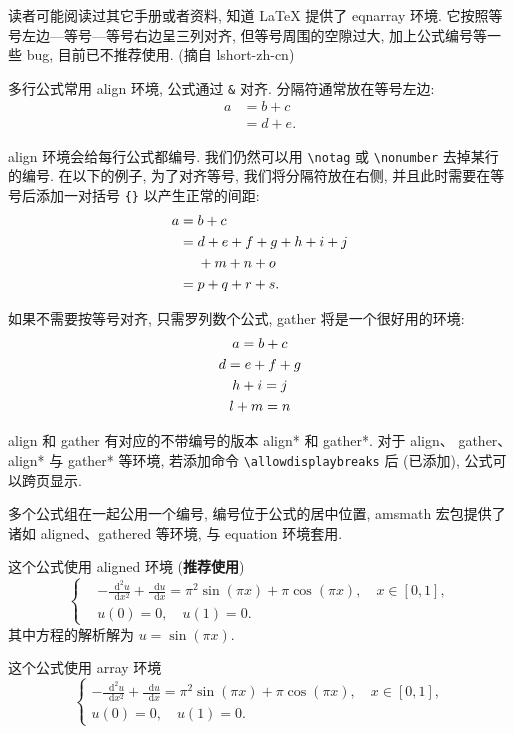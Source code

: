 \documentclass[zihao=-4,twoside,final]{ctexart}
\numberwithin{equation}{section}
\numberwithin{figure}{section}
\numberwithin{table}{section}
\theoremstyle{plain}
\newcommand{\dif}{\mathop{}\!\mathrm{d}}
\begin{document}
读者可能阅读过其它手册或者资料, 知道 LaTeX 提供了 eqnarray 环境. 它按照等号左边—等号—等号右边呈三列对齐, 但等号周围的空隙过大, 加上公式编号等一些 bug, 目前已不推荐使用. (摘自 lshort-zh-cn)

多行公式常用 align 环境, 公式通过 \verb|&| 对齐. 分隔符通常放在等号左边:
\begin{align}
a & = b + c \\
& = d + e.
\end{align}

align 环境会给每行公式都编号. 我们仍然可以用 \verb|\notag| 或 \verb|\nonumber| 去掉某行的编号. 在以下的例子,
为了对齐等号, 我们将分隔符放在右侧, 并且此时需要在等号后添加一对括号 \verb|{}| 以产生正常的间距:
\begin{align}
a ={} & b + c \\
={} & d + e + f + g + h + i + j \notag \\
& + m + n + o \\
={} & p + q + r + s.
\end{align}

如果不需要按等号对齐, 只需罗列数个公式, gather 将是一个很好用的环境:
\begin{gather}
a = b + c \\
d = e + f + g \notag \\
h + i = j \\
l + m = n
\end{gather}

align 和 gather 有对应的不带编号的版本 align* 和 gather*.
对于 align、 gather、align* 与 gather* 等环境, 若添加命令 \verb|\allowdisplaybreaks| 后 (已添加), 公式可以跨页显示.

多个公式组在一起公用一个编号, 编号位于公式的居中位置, amsmath 宏包提供了诸如 aligned、gathered 等环境, 与 equation 环境套用.

这个公式使用 aligned 环境 (\textbf{推荐使用})
\begin{equation}\label{eq:alignedEq}
\left\{\begin{aligned}
  &-\frac{{\dif}^{2} u}{\dif x^{2}}+\frac{\dif u}{\dif x}=\pi^{2} \sin (\pi x)+\pi \cos (\pi x),\quad x \in [0,1], \\
  &u(0)=0,\quad u(1)=0.
\end{aligned} \right.
\end{equation}
其中方程的解析解为 $u=\sin(\pi x)$.

这个公式使用 array 环境
\begin{equation}\label{eq:arrayEq}
\left\{\begin{array}{l}
\displaystyle
-\frac{{\dif}^{2} u}{\dif x^{2}}+\frac{\dif u}{\dif x}=\pi^{2} \sin (\pi x)+\pi \cos (\pi x),\quad x \in [0,1], \\[6pt]
u(0)=0,\quad u(1)=0.
\end{array} \right.
\end{equation}
\end{document}
